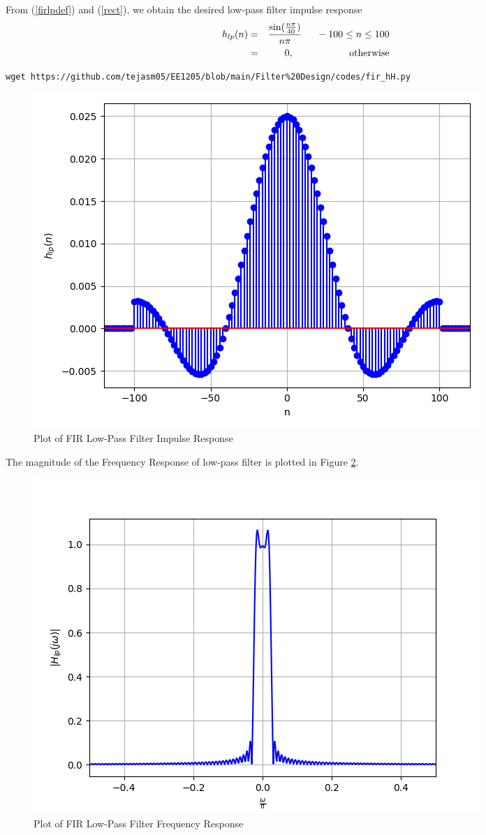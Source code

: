 \documentclass{article}
\begin{document}
From (\ref{firlpdef}) and (\ref{rect}), we obtain the desired low-pass filter impulse response
\begin{eqnarray}
\label{firlpfinal}
h_{lp}(n) &=& \frac{\sin(\frac{n\pi}{40})}{n\pi} \indent -100 \leq n \leq 100 \nonumber \\
&=& 0, \hspace{2cm} \mbox{otherwise}
\end{eqnarray}
\begin{lstlisting}[caption = {Code for Figure 6 and 7}]
wget https://github.com/tejasm05/EE1205/blob/main/Filter%20Design/codes/fir_hH.py
\end{lstlisting}
\begin{figure}[!h]
    \centering
    \includegraphics[width = \columnwidth]{figs/fir_hlp.png}
    \caption{Plot of FIR Low-Pass Filter Impulse Response}
    \label{fig:6}
\end{figure}

The magnitude of the Frequency Response of low-pass filter is plotted in Figure \ref{fig:7}.

\begin{figure}[!h]
    \centering
    \includegraphics[width = \columnwidth]{figs/firHLP.png}
    \caption{Plot of FIR Low-Pass Filter Frequency Response}
    \label{fig:7}
\end{figure}
\end{document}
